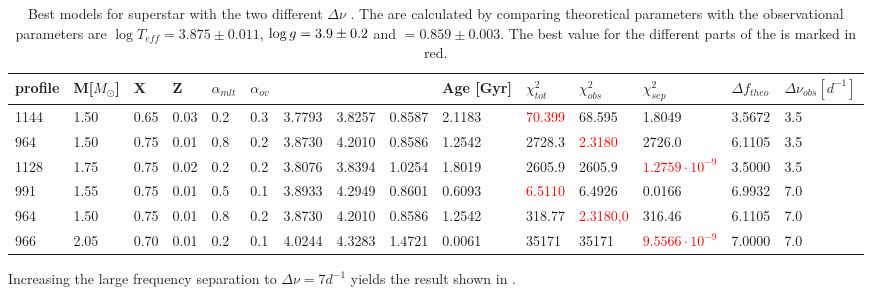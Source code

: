 
\begin{table}
	\caption{Best models for superstar with the two different $\Delta \nu$ . The \chis are calculated by comparing theoretical parameters with the observational parameters are $\log T_{eff} = 3.875 \pm 0.011$, $\log g = 3.9 \pm 0.2 $ and \lum$=0.859 \pm 0.003$. The best \chis value for the different parts of the \chis is marked in red. }
	\label{bestchisuper}
	\begin{tabular}{lllllllllllllll}
		\toprule
		profile & M[$M_\odot$] & X & Z & $\alpha_{mlt}$ & $\alpha_{ov}$ & \teff & \logg & \lum & Age [Gyr]& $\chi_{tot}^2$ & $\chi_{obs}^2$ & $\chi_{sep}^2$ & $\Delta f_{theo}$&$\Delta\nu_{obs} [d^{-1}]$\\
		\midrule
		  1144  &  1.50  & 0.65   & 0.03   & 0.2   & 0.3  & 3.7793 & 3.8257  & 0.8587 &2.1183 & \textcolor{red}{70.399}  & 68.595  & 1.8049 & 3.5672 &3.5   \\
		  964  &  1.50  & 0.75   & 0.01    & 0.8   & 0.2  & 3.8730  & 4.2010  & 0.8586 &  1.2542 &  2728.3 & \textcolor{red}{2.3180}  &  2726.0 & 6.1105 &3.5    \\
	     1128  & 1.75    & 0.75  & 0.02     & 0.2  & 0.2  & 3.8076  & 3.8394 & 1.0254 & 1.8019 & 2605.9  & 2605.9  & \textcolor{red}{$1.2759 \cdot 10^{-9}$}& 3.5000  &  3.5  \\
		  991  &  1.55  &  0.75  & 0.01       & 0.5  & 0.1 &  3.8933  & 4.2949  & 0.8601  & 0.6093   &  \textcolor{red}{6.5110} & 6.4926  & 0.0166  & 6.9932 &7.0 \\
	      964 &  1.50  & 0.75  & 0.01      & 0.8  & 0.2  &  3.8730 & 4.2010   & 0.8586 & 1.2542  &  318.77 &  \textcolor{red}{2.3180,0} &  316.46 &
	      6.1105 &7.0 \\
		  966 &  2.05 & 0.70  & 0.01      & 0.2  & 0.1  &  4.0244 & 4.3283 & 1.4721 &  0.0061   &  35171  & 35171 &   \textcolor{red}{$9.5566 \cdot 10^{-9}$}  & 7.0000 &7.0     \\         
		 \bottomrule
	\end{tabular}

\end{table}
Increasing the large frequency separation to $\Delta \nu = 7d^{-1}$ yields the result shown in .

